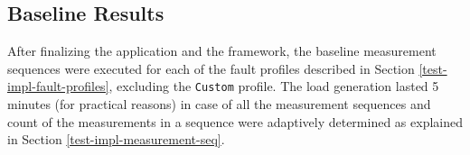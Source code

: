 


\subsection{Baseline Results} \label{baseline-results}

After finalizing the application and the framework, the baseline measurement sequences were executed for each of the fault profiles described in Section \ref{test-impl-fault-profiles}, excluding the \texttt{Custom} profile. The load generation lasted 5 minutes (for practical reasons) in case of all the measurement sequences and count of the measurements in a sequence were adaptively determined as explained in Section \ref{test-impl-measurement-seq}. 

